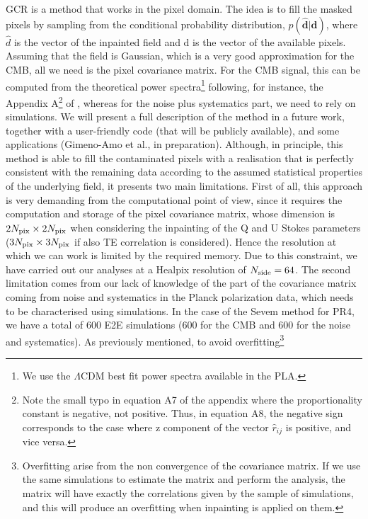GCR is a method that works in the pixel domain. The idea is to fill the masked pixels by sampling from the conditional probability distribution, $p(\mathbf{\hat{d}}|\mathbf{d})$, where $\hat{d}$ is the vector of the inpainted field and d is the vector of the available pixels. Assuming that the field is Gaussian, which is a very good approximation for the CMB, all we need is the pixel covariance matrix.
For the CMB signal, this 
can be computed from the theoretical power spectra\footnote{We use the $\Lambda$CDM best fit power spectra available in the PLA.} following, for instance, the Appendix A\footnote{
Note the small typo in equation A7 of the appendix
where the proportionality constant is negative, not positive. Thus, in equation A8, the negative sign corresponds to the case where z component of the vector $\hat{r}_{ij}$ is positive, and vice versa.} of \cite{Tegmark:2001zv}, whereas for the noise plus systematics part, we need to rely on simulations. We will present a full description of the method in a future work, together with a user-friendly
code (that will be publicly available), and some applications (Gimeno-Amo et al., in preparation). 
Although, in principle, this method is able to fill the contaminated pixels with a realisation that is perfectly consistent with the remaining data according to the assumed statistical properties of the underlying field, it presents two main limitations. First of all, this approach is very demanding from the computational point of view, since it requires the computation and storage of 
the pixel covariance matrix, whose dimension is $2N_{\rm pix} \times 2N_{\rm pix}$ when considering the inpainting of the Q and U Stokes parameters ($3N_{\rm pix} \times 3N_{\rm pix}$ if also TE correlation is considered). Hence the resolution at which we can work is
limited by the required memory. 
Due to this constraint, we have carried out our analyses at a Healpix resolution of $N_{\rm side}=64$. The second limitation comes from our lack of knowledge of the part of the covariance matrix coming from noise and systematics in the Planck polarization data, 
which needs to be characterised using simulations. In the case of the Sevem method for PR4, we have a total of 600 E2E simulations (600 for the CMB and 600 for the noise and systematics). As previously mentioned, to avoid overfitting\footnote{Overfitting arise from the non convergence of the covariance matrix. If we use the same simulations to estimate the matrix and perform the analysis, the matrix will have exactly the correlations given by the sample of simulations, and this will produce an overfitting when inpainting is applied on them.} 
